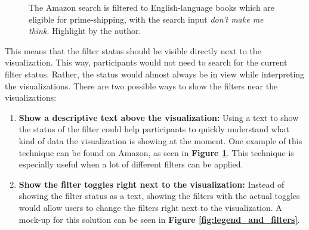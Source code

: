 \begin{figure}[htbp]
    \caption{The Amazon search is filtered to English-language books which are eligible for prime-shipping, with the search input \emph{don't make me think}. Highlight by the author.}
    \label{fig:amazon_filters}
\end{figure}

This means that the filter status should be visible directly next to the visualization. This way, participants would not need to search for the current filter status. Rather, the status would almost always be in view while interpreting the visualizations. There are two possible ways to show the filters near the visualizations:
\begin{enumerate}
    \item \textbf{Show a descriptive text above the visualization:} Using a text to show the status of the filter could help participants to quickly understand what kind of data the visualization is showing at the moment. One example of this technique can be found on Amazon, as seen in \textbf{Figure \ref{fig:amazon_filters}}. This technique is especially useful when a lot of different filters can be applied.
    \item \textbf{Show the filter toggles right next to the visualization:} Instead of showing the filter status as a text, showing the filters with the actual toggles would allow users to change the filters right next to the visualization. A mock-up for this solution can be seen in \textbf{Figure \ref{fig:legend_and_filters}}.
\end{enumerate}

